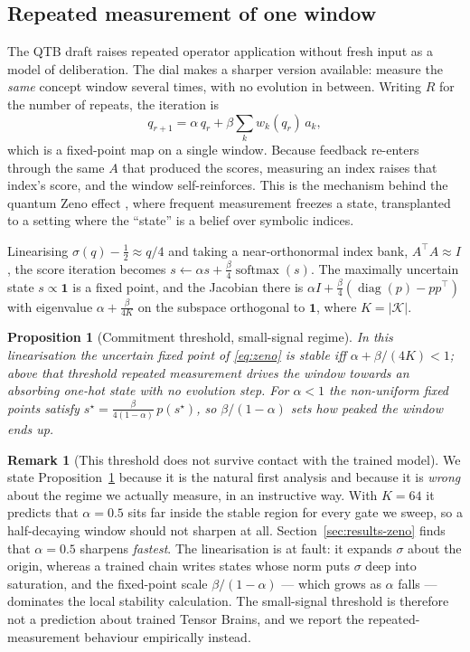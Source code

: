 \documentclass[11pt]{article}
\newtheorem{proposition}{Proposition}
\theoremstyle{definition}
\newtheorem{remark}{Remark}
\begin{document}
\subsection{Repeated measurement of one window}
\label{sec:zeno}

The QTB draft raises repeated operator application without fresh input as a model of
deliberation. The dial makes a sharper version available: measure the \emph{same}
concept window several times, with no evolution in between. Writing $R$ for the
number of repeats, the iteration is
\begin{equation}
q_{r+1} = \alpha\,q_r + \beta \sum_k w_k(q_r)\,a_k ,
\label{eq:zeno}
\end{equation}
which is a fixed-point map on a single window. Because feedback re-enters through the
same $A$ that produced the scores, measuring an index raises that index's score, and
the window self-reinforces. This is the mechanism behind the quantum Zeno effect
\citep{misra1977zeno}, where frequent measurement freezes a state, transplanted to a
setting where the ``state'' is a belief over symbolic indices.

Linearising $\sigma(q) - \tfrac12 \approx q/4$ and taking a near-orthonormal index
bank, $A^{\top}A \approx I$, the score iteration becomes
$s \leftarrow \alpha s + \tfrac{\beta}{4}\operatorname{softmax}(s)$.
The maximally uncertain state $s \propto \mathbf{1}$ is a fixed point, and the
Jacobian there is $\alpha I + \tfrac{\beta}{4}(\operatorname{diag}(p) - pp^{\top})$
with eigenvalue $\alpha + \tfrac{\beta}{4K}$ on the subspace orthogonal to
$\mathbf{1}$, where $K = |\mathcal{K}|$.

\begin{proposition}[Commitment threshold, small-signal regime]
\label{prop:zeno}
In this linearisation the uncertain fixed point of \eqref{eq:zeno} is stable iff
$\alpha + \beta/(4K) < 1$; above that threshold repeated measurement drives the
window towards an absorbing one-hot state with no evolution step. For $\alpha < 1$
the non-uniform fixed points satisfy $s^{\star} = \tfrac{\beta}{4(1-\alpha)}\,p(s^{\star})$,
so $\beta/(1-\alpha)$ sets how peaked the window ends up.
\end{proposition}

\begin{remark}[This threshold does not survive contact with the trained model]
\label{rem:zeno-fails}
We state Proposition~\ref{prop:zeno} because it is the natural first analysis and
because it is \emph{wrong} about the regime we actually measure, in an instructive
way. With $K = 64$ it predicts that $\alpha = 0.5$ sits far inside the stable region
for every gate we sweep, so a half-decaying window should not sharpen at all.
Section~\ref{sec:results-zeno} finds that $\alpha = 0.5$ sharpens \emph{fastest}. The
linearisation is at fault: it expands $\sigma$ about the origin, whereas a trained
chain writes states whose norm puts $\sigma$ deep into saturation, and the fixed-point
scale $\beta/(1-\alpha)$ --- which grows as $\alpha$ falls --- dominates the local
stability calculation. The small-signal threshold is therefore not a prediction about
trained Tensor Brains, and we report the repeated-measurement behaviour empirically
instead.
\end{remark}
\end{document}
